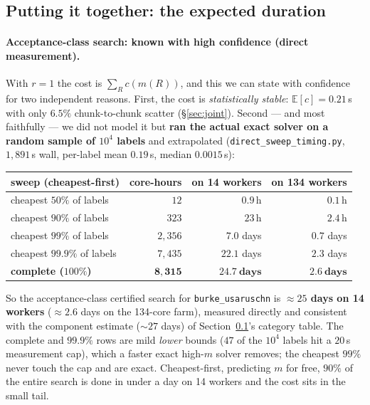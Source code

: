 \documentclass[11pt]{article}
\begin{document}
\subsection{Putting it together: the expected duration}
\label{sec:duration}

\paragraph{Acceptance-class search: known with high confidence (direct measurement).}
With $r{=}1$ the cost is $\sum_R c(m(R))$, and this we can state with confidence for
two independent reasons. First, the cost is \emph{statistically stable}: $\mathbb{E}[c]
=0.21$\,s with only $6.5\%$ chunk-to-chunk scatter (\S\ref{sec:joint}). Second --- and
most faithfully --- we did not model it but \textbf{ran the actual exact solver on a
random sample of $10^4$ labels} and extrapolated (\texttt{direct\_sweep\_timing.py},
$1{,}891$\,s wall, per-label mean $0.19$\,s, median $0.0015$\,s):
\begin{center}
\begin{tabular}{lrrr}
\toprule
sweep (cheapest-first) & core-hours & on 14 workers & on 134 workers\\
\midrule
cheapest $50\%$ of labels   & $12$     & $0.9$\,h   & $0.1$\,h\\
cheapest $90\%$ of labels   & $323$    & $23$\,h    & $2.4$\,h\\
cheapest $99\%$ of labels   & $2{,}356$ & $7.0$ days & $0.7$ days\\
cheapest $99.9\%$ of labels & $7{,}435$ & $22.1$ days & $2.3$ days\\
\textbf{complete ($100\%$)} & $\mathbf{8{,}315}$ & $\mathbf{24.7\ \text{days}}$ & $\mathbf{2.6\ \text{days}}$\\
\bottomrule
\end{tabular}
\end{center}
So the acceptance-class certified search for \texttt{burke\_usaruschn} is
\textbf{$\approx25$ days on 14 workers} ($\approx2.6$ days on the 134-core farm),
measured directly and consistent with the component estimate ($\sim27$ days) of
Section~\ref{sec:duration}'s category table. The complete and $99.9\%$ rows are mild
\emph{lower} bounds ($47$ of the $10^4$ labels hit a $20$\,s measurement cap), which a
faster exact high-$m$ solver removes; the cheapest $99\%$ never touch the cap and are
exact. Cheapest-first, predicting $m$ for free, $90\%$ of the entire search is done in
under a day on 14 workers and the cost sits in the small tail.
\end{document}
